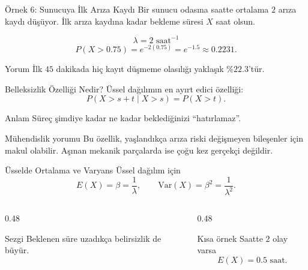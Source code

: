 \documentclass[light]{lutbeamer}
\begin{document}
\begin{frame}{Örnek 6: Sunucuya İlk Arıza Kaydı}
    \small
    Bir sunucu odasına saatte ortalama \(2\) arıza kaydı düşüyor. İlk arıza kaydına kadar bekleme süresi \(X\) saat olsun.

    \[
    \lambda=2 \text{ saat}^{-1}
    \]
    \[
    P(X>0.75)=e^{-2(0.75)}=e^{-1.5}\approx 0.2231.
    \]

    \begin{exampleblock}{Yorum}
        İlk \(45\) dakikada hiç kayıt düşmeme olasılığı yaklaşık \(\%22.3\)'tür.
    \end{exampleblock}
\end{frame}

\begin{frame}{Belleksizlik Özelliği Nedir?}
    \small
    Üssel dağılımın en ayırt edici özelliği:
    \[
    P(X>s+t\mid X>s)=P(X>t).
    \]

    \begin{block}{Anlam}
        Süreç şimdiye kadar ne kadar beklediğinizi ``hatırlamaz''.
    \end{block}

    \begin{exampleblock}{Mühendislik yorumu}
        Bu özellik, yaşlandıkça arıza riski değişmeyen bileşenler için makul olabilir.
        Aşınan mekanik parçalarda ise çoğu kez gerçekçi değildir.
    \end{exampleblock}
\end{frame}

\begin{frame}{Üsselde Ortalama ve Varyans}
    \small
    Üssel dağılım için
    \[
    E(X)=\beta=\frac{1}{\lambda},
    \qquad
    \mathrm{Var}(X)=\beta^2=\frac{1}{\lambda^2}.
    \]

    \begin{columns}[T]
        \begin{column}{0.48\textwidth}
            \begin{block}{Sezgi}
                Beklenen süre uzadıkça belirsizlik de büyür.
            \end{block}
        \end{column}
        \begin{column}{0.48\textwidth}
            \begin{exampleblock}{Kısa örnek}
                Saatte \(2\) olay varsa
                \[
                E(X)=0.5 \text{ saat}.
                \]
            \end{exampleblock}
        \end{column}
    \end{columns}
\end{frame}
\end{document}
